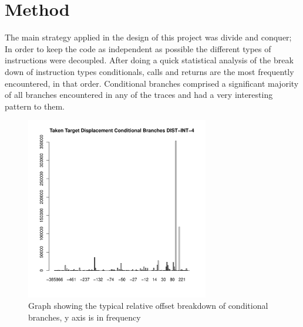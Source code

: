 \section{Method}
The main strategy applied in the design of this project was divide and conquer; In order to keep the code as independent as possible the different types of instructions were decoupled. After doing a quick statistical analysis of the break down of instruction types conditionals, calls and returns are the most frequently encountered, in that order. Conditional branches comprised a significant majority of all branches encountered in any of the traces and had a very interesting pattern to them.
\begin{figure}
\includegraphics[width=8cm]{"./Conditional Branches DIST-INT-4-histogram"}
\caption{Graph showing the typical relative offset breakdown of conditional branches, y axis is in frequency}
\end{figure}
